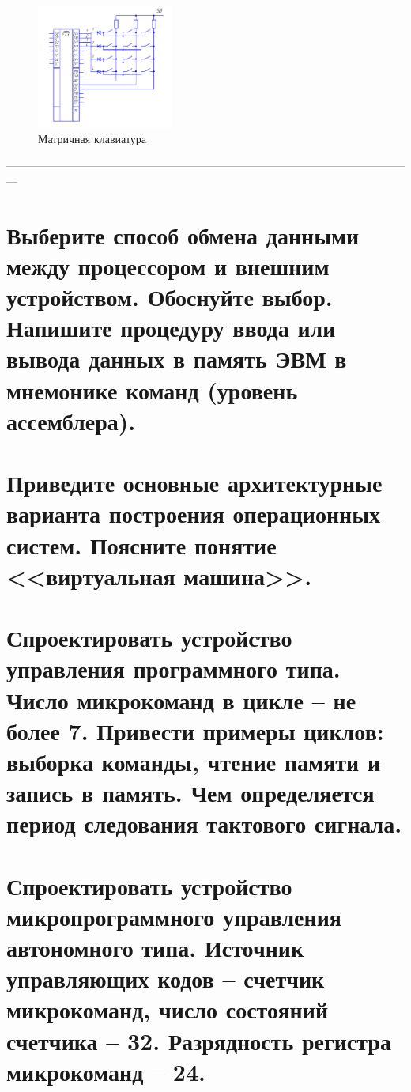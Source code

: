 \documentclass[unicode, 12pt, a4paper, oneside]{article}
\begin{document}
\begin{figure}[H]
\centering
\includegraphics[width=0.4\textwidth]{106_Keyboard.png}
\caption{Матричная клавиатура}
\end{figure}

---------------------------------------------------------------------------------------------------------------
\section{Выберите способ обмена данными между процессором и внешним устройством. Обоснуйте выбор. Напишите процедуру ввода или вывода данных в память ЭВМ в мнемонике команд (уровень ассемблера).}



\section{Приведите основные архитектурные варианта построения операционных систем. Поясните понятие <<виртуальная машина>>.}

\section{Спроектировать устройство управления программного типа. Число микрокоманд в цикле – не более 7. Привести примеры циклов: выборка команды, чтение памяти и запись в память. Чем определяется период следования тактового сигнала.}

\section{Спроектировать устройство микропрограммного управления автономного типа. Источник управляющих кодов – счетчик микрокоманд, число состояний счетчика – 32. Разрядность регистра микрокоманд – 24.}
\end{document}
